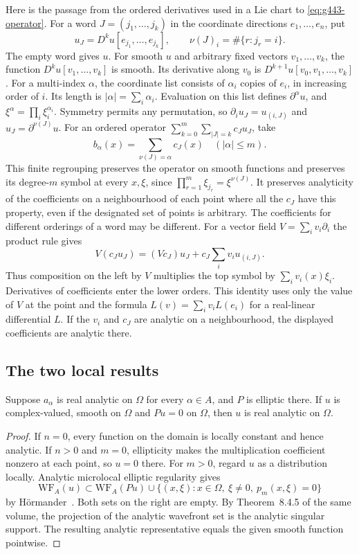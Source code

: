 Here is the passage from the ordered derivatives used in a Lie chart to
\eqref{eq:g443-operator}. For a word \(J=(j_1,\ldots,j_k)\) in the coordinate
directions \(e_1,\ldots,e_n\), put
\[
 u_J=D^ku[e_{j_1},\ldots,e_{j_k}],\qquad
 \nu(J)_i=\#\{r:j_r=i\}.
\]
The empty word gives \(u\). For smooth \(u\) and arbitrary fixed vectors
\(v_1,\ldots,v_k\), the function \(D^ku[v_1,\ldots,v_k]\) is smooth.
Its derivative along \(v_0\) is \(D^{k+1}u[v_0,v_1,\ldots,v_k]\).
For a multi-index \(\alpha\), the coordinate list consists of
\(\alpha_i\) copies of \(e_i\), in increasing order of \(i\). Its length
is \(|\alpha|=\sum_i\alpha_i\). Evaluation on this list defines
\(\partial^\alpha u\), and \(\xi^\alpha=\prod_i\xi_i^{\alpha_i}\).
Symmetry permits any permutation, so \(\partial_i u_J=u_{(i,J)}\) and
\(u_J=\partial^{\nu(J)}u\).
For an ordered operator \(\sum_{k=0}^m\sum_{|J|=k}c_J u_J\), take
\[
 b_\alpha(x)=\sum_{\nu(J)=\alpha}c_J(x) \quad (|\alpha|\leq m).
\]
This finite regrouping preserves the operator on smooth functions and
preserves its degree-\(m\) symbol at every \(x,\xi\), since
\(\prod_{r=1}^m\xi_{j_r}=\xi^{\nu(J)}\). It preserves analyticity of the
coefficients on a neighbourhood of each point where all the \(c_J\) have
this property, even if the designated set of points is arbitrary. The
coefficients for different orderings of a word may be different.
For a vector field \(V=\sum_i v_i\partial_i\) the product rule gives
\[
 V(c_Ju_J)=(Vc_J)u_J+c_J\sum_i v_i u_{(i,J)} .
\]
Thus composition on the left by \(V\) multiplies the top symbol by
\(\sum_i v_i(x)\xi_i\). Derivatives of coefficients enter the lower orders.
This identity uses only the value of \(V\) at the point and the formula
\(L(v)=\sum_i v_i L(e_i)\) for a real-linear differential \(L\).
If the \(v_i\) and \(c_J\) are
analytic on a neighbourhood, the displayed coefficients are analytic there.

\subsection{The two local results}
\begin{proposition}\label{prop:g443-analytic}
Suppose \(a_\alpha\) is real analytic on \(\Omega\) for every \(\alpha\in A\),
and \(P\) is elliptic there. If \(u\) is complex-valued, smooth on \(\Omega\)
and \(Pu=0\) on \(\Omega\), then \(u\) is real analytic on \(\Omega\).
\end{proposition}
\begin{proof}
If \(n=0\), every function on the domain is locally constant and hence analytic.
If \(n>0\) and \(m=0\),
ellipticity makes the multiplication coefficient nonzero at each point,
so \(u=0\) there. For \(m>0\), regard \(u\) as a distribution locally.
Analytic microlocal elliptic regularity gives
\[
 \mathrm{WF}_{\!A}(u)\subset
 \mathrm{WF}_{\!A}(Pu)\cup
 \{(x,\xi):x\in\Omega,\ \xi\ne0,\ p_m(x,\xi)=0\}
\]
by H\"ormander~\cite[Thm.~8.6.1]{g443-hormander}.
Both sets on the right are empty. By Theorem~8.4.5 of the same volume,
the projection of the analytic wavefront set is the analytic singular support.
The resulting analytic representative
equals the given smooth function pointwise.
\end{proof}

